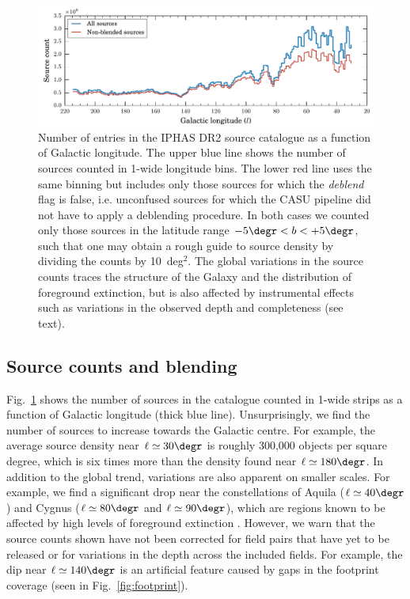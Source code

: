 \documentclass[a4paper,useAMS,usenatbib]{mn2e}
\begin{document}
\begin{figure}
    \vspace{1cm}
    \includegraphics[width=\textwidth]{figures/sourcecount/sourcecount.pdf} 
    \caption{Number of entries in the IPHAS DR2 source catalogue
    as a function of Galactic longitude.
    The upper blue line shows the number of sources
    counted in 1\degr-wide longitude bins.
    The lower red line uses the same binning
    but includes only those sources 
    for which the \emph{deblend} flag is {\sc false}, 
    i.e. unconfused sources for which the CASU pipeline
    did not have to apply a deblending procedure.
    In both cases we counted only those sources
    in the latitude range $-5\degr<b<+5\degr$,
    such that one may obtain a rough guide to source density
    by dividing the counts by 10~deg$^2$.
    The global variations in the source counts
    traces the structure of the Galaxy
    and the distribution of foreground extinction,
    but is also affected by instrumental effects
	such as variations in the observed depth
	and completeness (see text).
   }
    \label{fig:sourcecount}
\end{figure}

\subsection{Source counts and blending}
\label{sec:densities}

Fig.~\ref{fig:sourcecount} shows the number of sources
in the catalogue counted in 1\degr-wide strips
as a function of Galactic longitude (thick blue line).	
Unsurprisingly, we find the number of sources
to increase towards the Galactic centre.
For example, the average source density near $\ell\simeq 30\degr$
is roughly 300,000 objects per square degree,
which is six times more than the density
found near $\ell\simeq 180\degr$.
In addition to the global trend,
variations are also apparent on smaller scales.
For example, we find a significant drop near the constellations 
of Aquila ($\ell\simeq40\degr$) and Cygnus ($\ell\simeq80\degr$ and $\ell\simeq90\degr$),
which are regions known to be affected
by high levels of foreground extinction
\citep[the extremities of `the Great Rift', e.g.][]{BokBok}.
However, we warn that the source counts shown 
have not been corrected for field pairs that have yet
to be released or for variations in the depth across the included fields.
For example, the dip near $\ell\simeq140\degr$
is an artificial feature caused by gaps
in the footprint coverage (seen in Fig.~\ref{fig:footprint}).
\end{document}
